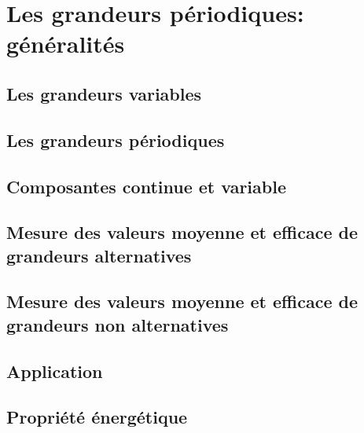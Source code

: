 \documentclass[11pt,a4paper,openany]{book}
\begin{document}
\newpage

\chapter{Les grandeurs périodiques: généralités}

\section{Les grandeurs variables}

\section{Les grandeurs périodiques}

\section{Composantes continue et variable}

\section{Mesure des valeurs moyenne et efficace de grandeurs alternatives}

\section{Mesure des valeurs moyenne et efficace de grandeurs non alternatives}

\section{Application}

\section{Propriété énergétique}

\end{document}
